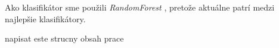 Ako klasifikátor sme použili \emph{RandomForest} \cite{randomForestPaper}, pretože aktuálne patrí medzi najlepšie klasifikátory.




\todo napisat este strucny obsah prace

